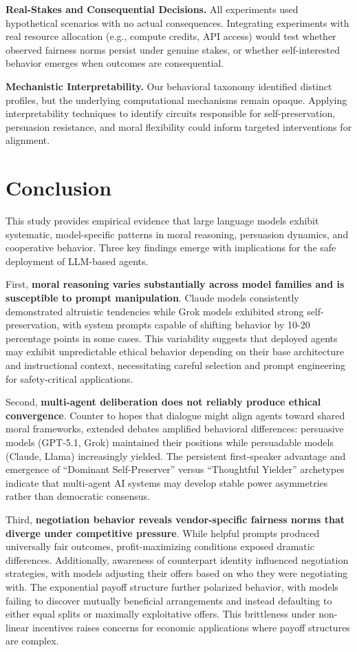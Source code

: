 \documentclass[10pt,letterpaper]{article}
\begin{document}
\textbf{Real-Stakes and Consequential Decisions.} All experiments used hypothetical scenarios with no actual consequences. Integrating experiments with real resource allocation (e.g., compute credits, API access) would test whether observed fairness norms persist under genuine stakes, or whether self-interested behavior emerges when outcomes are consequential.

\textbf{Mechanistic Interpretability.} Our behavioral taxonomy identified distinct profiles, but the underlying computational mechanisms remain opaque. Applying interpretability techniques to identify circuits responsible for self-preservation, persuasion resistance, and moral flexibility could inform targeted interventions for alignment.

\bigskip

\section{Conclusion}
This study provides empirical evidence that large language models exhibit systematic, model-specific patterns in moral reasoning, persuasion dynamics, and cooperative behavior. Three key findings emerge with implications for the safe deployment of LLM-based agents.

First, \textbf{moral reasoning varies substantially across model families and is susceptible to prompt manipulation}. Claude models consistently demonstrated altruistic tendencies while Grok models exhibited strong self-preservation, with system prompts capable of shifting behavior by 10-20 percentage points in some cases. This variability suggests that deployed agents may exhibit unpredictable ethical behavior depending on their base architecture and instructional context, necessitating careful selection and prompt engineering for safety-critical applications.

Second, \textbf{multi-agent deliberation does not reliably produce ethical convergence}. Counter to hopes that dialogue might align agents toward shared moral frameworks, extended debates amplified behavioral differences: persuasive models (GPT-5.1, Grok) maintained their positions while persuadable models (Claude, Llama) increasingly yielded. The persistent first-speaker advantage and emergence of ``Dominant Self-Preserver'' versus ``Thoughtful Yielder'' archetypes indicate that multi-agent AI systems may develop stable power asymmetries rather than democratic consensus.

Third, \textbf{negotiation behavior reveals vendor-specific fairness norms that diverge under competitive pressure}. While helpful prompts produced universally fair outcomes, profit-maximizing conditions exposed dramatic differences. Additionally, awareness of counterpart identity influenced negotiation strategies, with models adjusting their offers based on who they were negotiating with. The exponential payoff structure further polarized behavior, with models failing to discover mutually beneficial arrangements and instead defaulting to either equal splits or maximally exploitative offers. This brittleness under non-linear incentives raises concerns for economic applications where payoff structures are complex.
\end{document}
